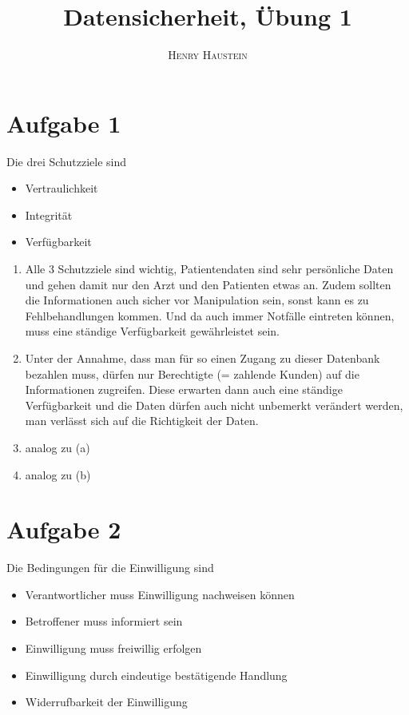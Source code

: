 \documentclass{article}
\title{\textbf{Datensicherheit, Übung 1}}
\author{\textsc{Henry Haustein}}
\date{}
\begin{document}
	\maketitle
	
	\section*{Aufgabe 1}
	Die drei Schutzziele sind
	\begin{itemize}
		\item Vertraulichkeit
		\item Integrität
		\item Verfügbarkeit
	\end{itemize}
	\begin{enumerate}[label=(\alph*)]
		\item Alle 3 Schutzziele sind wichtig, Patientendaten sind sehr persönliche Daten und gehen damit nur den Arzt und den Patienten etwas an. Zudem sollten die Informationen auch sicher vor Manipulation sein, sonst kann es zu Fehlbehandlungen kommen. Und da auch immer Notfälle eintreten können, muss eine ständige Verfügbarkeit gewährleistet sein.
		\item Unter der Annahme, dass man für so einen Zugang zu dieser Datenbank bezahlen muss, dürfen nur Berechtigte (= zahlende Kunden) auf die Informationen zugreifen. Diese erwarten dann auch eine ständige Verfügbarkeit und die Daten dürfen auch nicht unbemerkt verändert werden, man verlässt sich auf die Richtigkeit der Daten.
		\item analog zu (a)
		\item analog zu (b)
	\end{enumerate}

	\section*{Aufgabe 2}
	Die Bedingungen für die Einwilligung sind
	\begin{itemize}
		\item Verantwortlicher muss Einwilligung nachweisen können
		\item Betroffener muss informiert sein
		\item Einwilligung muss freiwillig erfolgen
		\item Einwilligung durch eindeutige bestätigende Handlung
		\item Widerrufbarkeit der Einwilligung
	\end{itemize}
	
\end{document}
